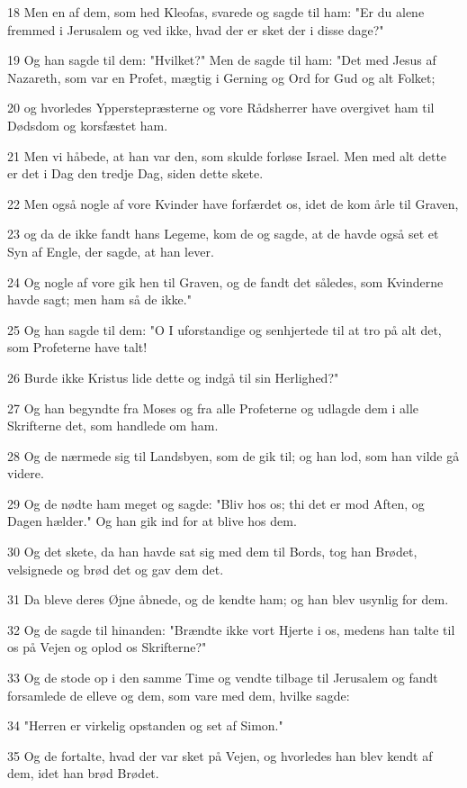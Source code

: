 \par 18 Men en af dem, som hed Kleofas, svarede og sagde til ham: "Er du alene fremmed i Jerusalem og ved ikke, hvad der er sket der i disse dage?"
\par 19 Og han sagde til dem: "Hvilket?" Men de sagde til ham: "Det med Jesus af Nazareth, som var en Profet, mægtig i Gerning og Ord for Gud og alt Folket;
\par 20 og hvorledes Ypperstepræsterne og vore Rådsherrer have overgivet ham til Dødsdom og korsfæstet ham.
\par 21 Men vi håbede, at han var den, som skulde forløse Israel. Men med alt dette er det i Dag den tredje Dag, siden dette skete.
\par 22 Men også nogle af vore Kvinder have forfærdet os, idet de kom årle til Graven,
\par 23 og da de ikke fandt hans Legeme, kom de og sagde, at de havde også set et Syn af Engle, der sagde, at han lever.
\par 24 Og nogle af vore gik hen til Graven, og de fandt det således, som Kvinderne havde sagt; men ham så de ikke."
\par 25 Og han sagde til dem: "O I uforstandige og senhjertede til at tro på alt det, som Profeterne have talt!
\par 26 Burde ikke Kristus lide dette og indgå til sin Herlighed?"
\par 27 Og han begyndte fra Moses og fra alle Profeterne og udlagde dem i alle Skrifterne det, som handlede om ham.
\par 28 Og de nærmede sig til Landsbyen, som de gik til; og han lod, som han vilde gå videre.
\par 29 Og de nødte ham meget og sagde: "Bliv hos os; thi det er mod Aften, og Dagen hælder." Og han gik ind for at blive hos dem.
\par 30 Og det skete, da han havde sat sig med dem til Bords, tog han Brødet, velsignede og brød det og gav dem det.
\par 31 Da bleve deres Øjne åbnede, og de kendte ham; og han blev usynlig for dem.
\par 32 Og de sagde til hinanden: "Brændte ikke vort Hjerte i os, medens han talte til os på Vejen og oplod os Skrifterne?"
\par 33 Og de stode op i den samme Time og vendte tilbage til Jerusalem og fandt forsamlede de elleve og dem, som vare med dem, hvilke sagde:
\par 34 "Herren er virkelig opstanden og set af Simon."
\par 35 Og de fortalte, hvad der var sket på Vejen, og hvorledes han blev kendt af dem, idet han brød Brødet.
